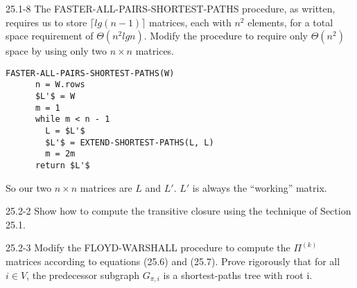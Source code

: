 




\homeworkheader{\classnameandsection}

\begin{problem}{25.1-8}
  The FASTER-ALL-PAIRS-SHORTEST-PATHS procedure, as written, requires us to store $\lceil lg(n-1) \rceil$ matrices,
  each with $n^2$ elements, for a total space requirement of $\Theta(n^2 lg n)$. Modify the procedure to require only
  $\Theta(n^2)$ space by using only two $n \times n$ matrices.
  \begin{solution}
    \begin{lstlisting}[mathescape]
    FASTER-ALL-PAIRS-SHORTEST-PATHS(W)
      n = W.rows
      $L'$ = W
      m = 1
      while m < n - 1
        L = $L'$
        $L'$ = EXTEND-SHORTEST-PATHS(L, L)
        m = 2m
      return $L'$
    \end{lstlisting}
    
    \noindent So our two $n \times n$ matrices are $L$ and $L'$.  $L'$ is always the ``working'' matrix.
  \end{solution}
\end{problem}

\begin{problem}{25.2-2}
  Show how to compute the transitive closure using the technique of Section 25.1.
\end{problem}

\begin{problem}{25.2-3}
  Modify the FLOYD-WARSHALL procedure to compute the $\Pi^{(k)}$ matrices according to equations (25.6) and (25.7).
  Prove rigorously that for all $i \in V$, the predecessor subgraph $G_{\pi,i}$ is a shortest-paths tree with root i.
\end{problem}

